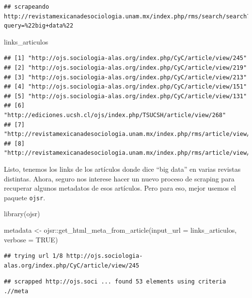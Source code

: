 \documentclass[
]{book}
\newenvironment{Shaded}{\begin{snugshade}}{\end{snugshade}}
\newcommand{\AttributeTok}[1]{\textcolor[rgb]{0.77,0.63,0.00}{#1}}
\newcommand{\ConstantTok}[1]{\textcolor[rgb]{0.00,0.00,0.00}{#1}}
\newcommand{\FunctionTok}[1]{\textcolor[rgb]{0.00,0.00,0.00}{#1}}
\newcommand{\NormalTok}[1]{#1}
\newcommand{\OtherTok}[1]{\textcolor[rgb]{0.56,0.35,0.01}{#1}}
\newcommand{\SpecialCharTok}[1]{\textcolor[rgb]{0.00,0.00,0.00}{#1}}
\begin{document}
\begin{verbatim}
## scrapeando http://revistamexicanadesociologia.unam.mx/index.php/rms/search/search?query=%22big+data%22
\end{verbatim}

\begin{Shaded}
\begin{Highlighting}[]
\NormalTok{links\_articulos}
\end{Highlighting}
\end{Shaded}

\begin{verbatim}
## [1] "http://ojs.sociologia-alas.org/index.php/CyC/article/view/245"                    
## [2] "http://ojs.sociologia-alas.org/index.php/CyC/article/view/219"                    
## [3] "http://ojs.sociologia-alas.org/index.php/CyC/article/view/213"                    
## [4] "http://ojs.sociologia-alas.org/index.php/CyC/article/view/151"                    
## [5] "http://ojs.sociologia-alas.org/index.php/CyC/article/view/131"                    
## [6] "http://ediciones.ucsh.cl/ojs/index.php/TSUCSH/article/view/268"                   
## [7] "http://revistamexicanadesociologia.unam.mx/index.php/rms/article/view/57723"      
## [8] "http://revistamexicanadesociologia.unam.mx/index.php/rms/article/view/57723/51185"
\end{verbatim}

Listo, tenemos los links de los artículos donde dice ``big data'' en varias revistas distintas. Ahora, seguro nos interese hacer un nuevo proceso de scraping para recuperar algunos metadatos de esos artículos. Pero para eso, mejor usemos el paquete \texttt{ojsr}.

\begin{Shaded}
\begin{Highlighting}[]
\FunctionTok{library}\NormalTok{(ojsr)}

\NormalTok{metadata }\OtherTok{\textless{}{-}}\NormalTok{ ojsr}\SpecialCharTok{::}\FunctionTok{get\_html\_meta\_from\_article}\NormalTok{(}\AttributeTok{input\_url =}\NormalTok{ links\_articulos, }\AttributeTok{verbose =} \ConstantTok{TRUE}\NormalTok{)}
\end{Highlighting}
\end{Shaded}

\begin{verbatim}
## trying url 1/8 http://ojs.sociologia-alas.org/index.php/CyC/article/view/245
\end{verbatim}

\begin{verbatim}
## scrapped http://ojs.soci ... found 53 elements using criteria .//meta
\end{verbatim}
\end{document}
